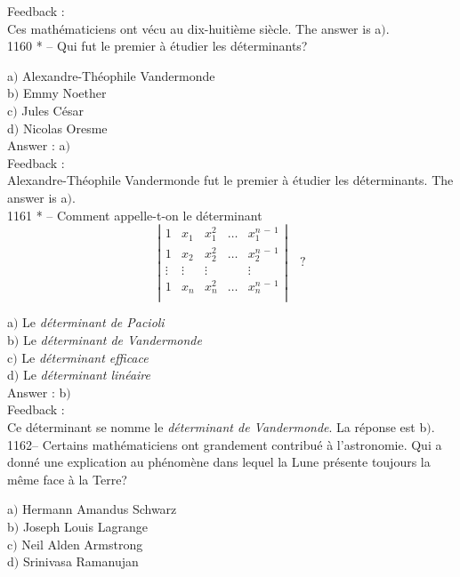 \documentclass[letterpaper, 12pt]{article}
\begin{document}
Feedback : \\
Ces math\'ematiciens ont v\'ecu au dix-huiti\`eme si\`ecle. The answer is
a$)$.\\

1160 * -- Qui fut le premier \`a \'etudier les d\'eterminants?

a$)$ Alexandre-Th\'eophile Vandermonde \\
b$)$ Emmy Noether \\
c$)$ Jules C\'esar \\
d$)$ Nicolas Oresme   \\

Answer : a$)$\\

Feedback : \\
Alexandre-Th\'eophile Vandermonde fut le premier \`a \'etudier les
d\'eterminants. The answer is a$)$.\\

1161 * -- Comment appelle-t-on le d\'eterminant
$$\left|\begin{matrix}
1      & x_1 & x_1^2 & \ldots & x_1^{n\,-\,1} \\
1      & x_2 & x_2^2 & \ldots & x_2^{n\,-\,1} \\
\vdots &\vdots &\vdots &      & \vdots    \\
1      & x_n & x_n^2 & \ldots & x_n^{n\,-\,1} \\
\end{matrix}\right|\quad?$$

a$)$ Le {\sl d\'eterminant de Pacioli} \\
b$)$ Le {\sl d\'eterminant de Vandermonde} \\
c$)$ Le {\sl d\'eterminant efficace} \\
d$)$ Le {\sl d\'eterminant lin\'eaire}  \\

Answer : b$)$\\

Feedback : \\
Ce d\'eterminant se nomme le {\sl d\'eterminant de Vandermonde}. La
r\'eponse est b$)$.\\

1162-- Certains math\'ematiciens ont grandement contribu\'e \`a
l'astronomie. Qui a donn\'e une explication au ph\'enom\`ene dans
lequel la Lune pr\'esente toujours la m\^eme face \`a la Terre?

a$)$ Hermann Amandus Schwarz \\
b$)$ Joseph Louis Lagrange \\
c$)$ Neil Alden Armstrong \\
d$)$ Srinivasa Ramanujan\\
\end{document}
